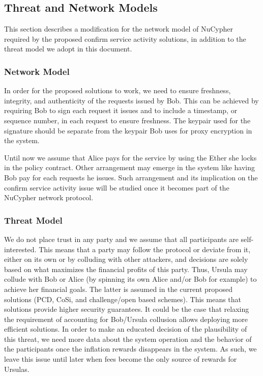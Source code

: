 \subsection{Threat and Network Models}
\label{threat-network-model}
This section describes a modification for the network model of NuCypher 
required by the proposed confirm service activity solutions, in 
addition to the threat model we adopt in this document.


\subsubsection{Network Model}
In order for the proposed solutions to work, we need to ensure freshness, 
integrity, and authenticity of the requests issued by Bob. This can be achieved 
by requiring Bob to sign each request it issues and to include a timestamp, or 
sequence number, in each request to ensure freshness. The keypair used for the 
signature should be separate from the keypair Bob uses for proxy encryption in the 
system. 


Until now we assume that Alice pays for the service by using the Ether she locks 
in the policy contract. Other arrangement may emerge in the system like having 
Bob pay for each requests he issues. Such arrangement and its implication on the 
confirm service activity issue will be studied once it becomes part of the NuCypher 
network protocol.


\subsubsection{Threat Model}
We do not place trust in any party and we assume that all participants are 
self-interested. This means that a party may 
follow the protocol or deviate from it, either on its own or by colluding 
with other attackers, and decisions are solely based on what maximizes the financial profits
of this party. Thus, Ursula may collude with Bob or Alice (by spinning 
its own Alice and/or Bob for example) to achieve her financial goals. 
The latter is assumed in the current proposed solutions (PCD, CoSi, and 
challenge/open based schemes). This means that solutions provide higher 
security guarantees. It could be the case that relaxing the requirement of 
accounting for Bob/Ursula collusion allows deploying more efficient solutions. 
In order to make an educated decision of the plausibility of this threat, we need 
more data about the system operation and the behavior of the participants 
once the inflation rewards disappears in the system. As such, we leave this 
issue until later when fees become the only source of rewards for Ursulas. 


